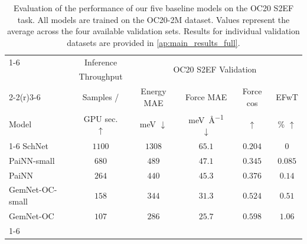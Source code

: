 \begin{table}[h]
\centering
\caption{Evaluation of the performance of our five baseline models on the OC20 S2EF task. All models are trained on the OC20-2M dataset. Values represent the average across the four available validation sets. Results for individual validation datasets are provided in \cref{ap:main_results_full}.}
\begin{tabular}{lccccc}
\cmidrule(r){1-6}
\multicolumn{1}{c}{\multirow{4}{*}{}}  & Inference & \multicolumn{4}{c}{\multirow{2}{*}{OC20 S2EF Validation}} 
\\
\multicolumn{1}{c}{}  & Throughput & \multicolumn{4}{c}{}
\\\cmidrule(r){2-2}\cmidrule(r){3-6}
\multicolumn{1}{c}{}      &               Samples /      &      Energy MAE  &    Force MAE  & Force cos & EFwT  \\
  \multicolumn{1}{l}{Model}        &         GPU sec. $\uparrow$          &      \si{\milli\electronvolt} $\downarrow$   &    \si{\milli\electronvolt\per\angstrom} $\downarrow$     & $\uparrow$  & \% $\uparrow$  \\\cmidrule(r){1-6}
SchNet                &           $1100$          &   $1308$     &   $65.1$    &  $0.204$  &  $0$ \\
PaiNN-small                &        $680$             &    $489$      &     $47.1$     &  $0.345$ &  $0.085$  \\
PaiNN                 &        $264$             &   $440$     &   $45.3$      &  $0.376$   & $0.14$ \\
GemNet-OC-small                 &           $158$          &   $344$     &   $31.3$      &  $0.524$   & $0.51$ \\
GemNet-OC              &           $107$          &    $286$      &     $25.7$   &  $0.598$    & $1.06$  \\\cmidrule(r){1-6}
\end{tabular}
\label{tab:baselines}
\end{table}

\raggedbottom